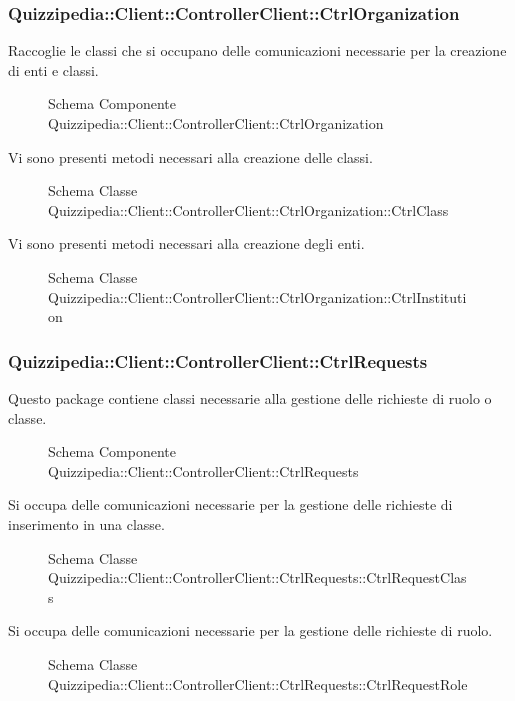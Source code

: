\subsubsection{Quizzipedia::Client::ControllerClient::CtrlOrganization}
Raccoglie le classi che si occupano delle comunicazioni necessarie per la creazione di enti e classi.
\begin{figure}[H]
\centering
\noindent{}
\caption{Schema Componente Quizzipedia::Client::ControllerClient::CtrlOrganization}
\end{figure}
Vi sono presenti metodi necessari alla creazione delle classi.
\begin{figure}[H]
\centering
\noindent{}
\caption{Schema Classe Quizzipedia::Client::ControllerClient::CtrlOrganization::CtrlClass}
\end{figure}
Vi sono presenti metodi necessari alla creazione degli enti.
\begin{figure}[H]
\centering
\noindent{}
\caption{Schema Classe Quizzipedia::Client::ControllerClient::CtrlOrganization::CtrlInstitution}
\end{figure}
\subsubsection{Quizzipedia::Client::ControllerClient::CtrlRequests}
Questo package contiene classi necessarie alla gestione delle richieste di ruolo o classe.
\begin{figure}[H]
\centering
\noindent{}
\caption{Schema Componente Quizzipedia::Client::ControllerClient::CtrlRequests}
\end{figure}
Si occupa delle comunicazioni necessarie per la gestione delle richieste di inserimento in una classe.
\begin{figure}[H]
\centering
\noindent{}
\caption{Schema Classe Quizzipedia::Client::ControllerClient::CtrlRequests::CtrlRequestClass}
\end{figure}
Si occupa delle comunicazioni necessarie per la gestione delle richieste di ruolo.
\begin{figure}[H]
\centering
\noindent{}
\caption{Schema Classe Quizzipedia::Client::ControllerClient::CtrlRequests::CtrlRequestRole}
\end{figure}
